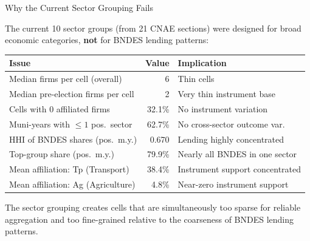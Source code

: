 \documentclass[aspectratio=169,11pt]{beamer}
\begin{document}
\begin{frame}{Why the Current Sector Grouping Fails}

The current 10 sector groups (from 21 CNAE sections) were designed for broad economic categories, \textbf{not} for BNDES lending patterns:

\smallskip

\begin{center}
\small
\begin{tabular}{l r l}
\toprule
\textbf{Issue} & \textbf{Value} & \textbf{Implication} \\
\midrule
Median firms per cell (overall) & 6 & Thin cells \\
Median pre-election firms per cell & 2 & Very thin instrument base \\
Cells with 0 affiliated firms & 32.1\% & No instrument variation \\
Muni-years with $\leq 1$ pos.\ sector & 62.7\% & No cross-sector outcome var. \\
HHI of BNDES shares (pos.\ m.y.) & 0.670 & Lending highly concentrated \\
Top-group share (pos.\ m.y.) & 79.9\% & Nearly all BNDES in one sector \\
\midrule
Mean affiliation: Tp (Transport) & 38.4\% & Instrument support concentrated \\
Mean affiliation: Ag (Agriculture) & 4.8\% & Near-zero instrument support \\
\bottomrule
\end{tabular}
\end{center}

\smallskip

The sector grouping creates cells that are simultaneously too sparse for reliable aggregation and too fine-grained relative to the coarseness of BNDES lending patterns.

\end{frame}
\end{document}
